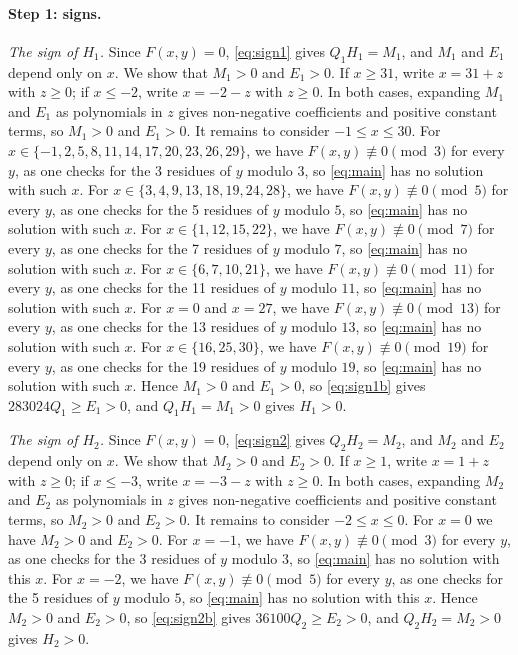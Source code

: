 \documentclass[11pt]{article}
\begin{document}
\paragraph{Step 1: signs.} \emph{The sign of $H_{1}$.} Since $F(x,y)=0$, \eqref{eq:sign1} gives $Q_{1}H_{1}=M_{1}$, and $M_{1}$ and $E_{1}$ depend only on $x$. We show that $M_{1}>0$ and $E_{1}>0$. If $x\geq31$, write $x=31+z$ with $z\geq0$; if $x\leq-2$, write $x=-2-z$ with $z\geq0$. In both cases, expanding $M_{1}$ and $E_{1}$ as polynomials in $z$ gives non-negative coefficients and positive constant terms, so $M_{1}>0$ and $E_{1}>0$. It remains to consider $-1\leq x\leq30$. For $x\in\{-1,\allowbreak 2,\allowbreak 5,\allowbreak 8,\allowbreak 11,\allowbreak 14,\allowbreak 17,\allowbreak 20,\allowbreak 23,\allowbreak 26,\allowbreak 29\}$, we have $F(x,y)\not\equiv0\pmod{3}$ for every $y$, as one checks for the 3 residues of $y$ modulo $3$, so \eqref{eq:main} has no solution with such $x$. For $x\in\{3,\allowbreak 4,\allowbreak 9,\allowbreak 13,\allowbreak 18,\allowbreak 19,\allowbreak 24,\allowbreak 28\}$, we have $F(x,y)\not\equiv0\pmod{5}$ for every $y$, as one checks for the 5 residues of $y$ modulo $5$, so \eqref{eq:main} has no solution with such $x$. For $x\in\{1,\allowbreak 12,\allowbreak 15,\allowbreak 22\}$, we have $F(x,y)\not\equiv0\pmod{7}$ for every $y$, as one checks for the 7 residues of $y$ modulo $7$, so \eqref{eq:main} has no solution with such $x$. For $x\in\{6,\allowbreak 7,\allowbreak 10,\allowbreak 21\}$, we have $F(x,y)\not\equiv0\pmod{11}$ for every $y$, as one checks for the 11 residues of $y$ modulo $11$, so \eqref{eq:main} has no solution with such $x$. For $x=0$ and $x=27$, we have $F(x,y)\not\equiv0\pmod{13}$ for every $y$, as one checks for the 13 residues of $y$ modulo $13$, so \eqref{eq:main} has no solution with such $x$. For $x\in\{16,\allowbreak 25,\allowbreak 30\}$, we have $F(x,y)\not\equiv0\pmod{19}$ for every $y$, as one checks for the 19 residues of $y$ modulo $19$, so \eqref{eq:main} has no solution with such $x$. Hence $M_{1}>0$ and $E_{1}>0$, so \eqref{eq:sign1b} gives $283024Q_{1}\geq E_{1}>0$, and $Q_{1}H_{1}=M_{1}>0$ gives $H_{1}>0$.

\emph{The sign of $H_{2}$.} Since $F(x,y)=0$, \eqref{eq:sign2} gives $Q_{2}H_{2}=M_{2}$, and $M_{2}$ and $E_{2}$ depend only on $x$. We show that $M_{2}>0$ and $E_{2}>0$. If $x\geq1$, write $x=1+z$ with $z\geq0$; if $x\leq-3$, write $x=-3-z$ with $z\geq0$. In both cases, expanding $M_{2}$ and $E_{2}$ as polynomials in $z$ gives non-negative coefficients and positive constant terms, so $M_{2}>0$ and $E_{2}>0$. It remains to consider $-2\leq x\leq0$. For $x=0$ we have $M_{2}>0$ and $E_{2}>0$. For $x=-1$, we have $F(x,y)\not\equiv0\pmod{3}$ for every $y$, as one checks for the 3 residues of $y$ modulo $3$, so \eqref{eq:main} has no solution with this $x$. For $x=-2$, we have $F(x,y)\not\equiv0\pmod{5}$ for every $y$, as one checks for the 5 residues of $y$ modulo $5$, so \eqref{eq:main} has no solution with this $x$. Hence $M_{2}>0$ and $E_{2}>0$, so \eqref{eq:sign2b} gives $36100Q_{2}\geq E_{2}>0$, and $Q_{2}H_{2}=M_{2}>0$ gives $H_{2}>0$.
\end{document}
